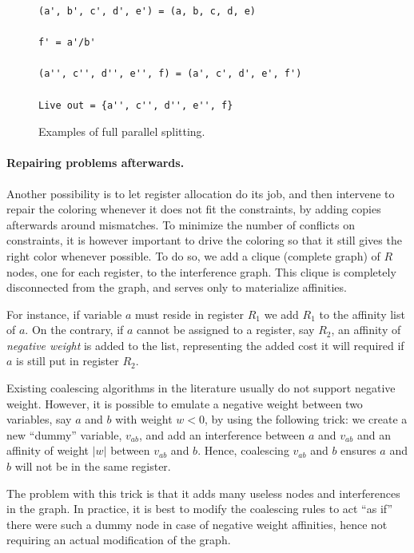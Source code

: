{\begin{figure}
\begin{minipage}{.6\textwidth}
\begin{center}
\begin{verbatim}
(a', b', c', d', e') = (a, b, c, d, e)

f' = a'/b'

(a'', c'', d'', e'', f) = (a', c', d', e', f')

Live out = {a'', c'', d'', e'', f}
      \end{verbatim}

  \end{center}
  \end{minipage}
  \caption{Examples of full parallel splitting.}
  \label{fig:reg-split-all}
\end{figure}

\paragraph{Repairing problems afterwards.}

Another possibility is to let register allocation do its job, and then 
intervene to repair the coloring whenever it does not fit the constraints, by 
adding copies afterwards around mismatches. To minimize the number of conflicts 
on constraints, it is however important to drive the coloring so that it still 
gives the right color whenever possible. 
To do so, we add a clique (complete graph) of $R$ nodes, one for each register, to the interference graph.
This clique is completely disconnected from the graph, and serves only to materialize affinities.

For instance, if variable $a$ must reside in register $R_1$ we add $R_1$ to the affinity list of $a$. 
On the contrary, if $a$ cannot be assigned to a register, say $R_2$, an affinity of \emph{negative weight} is added to the list, representing the added cost it will required if $a$ is still put in register $R_2$.

Existing coalescing algorithms in the literature usually do not support negative weight.
However, it is possible to emulate a negative weight between two variables, say $a$ and $b$ with weight $w<0$, by using the following trick:
we create a new ``dummy'' variable, $v_{ab}$, and add an interference between $a$ and $v_{ab}$ and an affinity of weight $|w|$ between $v_{ab}$ and $b$.
Hence, coalescing $v_{ab}$ and $b$ ensures $a$ and $b$ will not be in the same register.
 
The problem with this trick is that it adds many useless nodes and interferences in the graph.
In practice, it is best to modify the coalescing rules to act ``as if'' there were such a dummy node in case of negative weight affinities, hence not requiring an actual modification of the graph.







}
